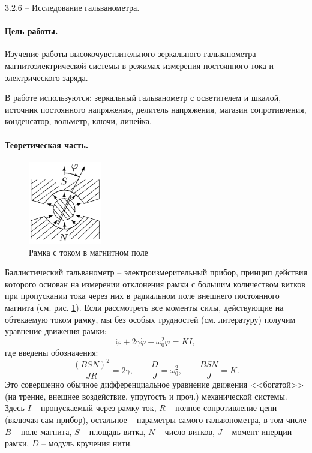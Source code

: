 \documentclass{../lab_class}
\begin{document}
{\Large 3.2.6 -- Исследование гальванометра.}

\paragraph{Цель работы.}
Изучение работы высокочувствительного зеркального гальванометра магнитоэлектрической системы в режимах измерения постоянного тока и электрического заряда.

В работе используются: зеркальный гальванометр с осветителем и шкалой, источник постоянного напряжения, делитель напряжения, магазин сопротивления, конденсатор, вольметр, ключи, линейка.

\paragraph{Теоретическая часть.}

\begin{figure}
	\centering
	\includegraphics[width=3.2cm]{galvanometer.png}
	\caption{Рамка с током в магнитном поле}
	\label{fig:galvano}
\end{figure}

Баллистический гальванометр -- электроизмерительный прибор, принцип действия которого основан на измерении отклонения рамки с большим количеством витков при пропускании тока через них в радиальном поле внешнего постоянного магнита (см. рис. \ref{fig:galvano}). Если рассмотреть все моменты силы, действующие на обтекаемую током рамку, мы без особых трудностей (см. литературу) получим уравнение движения рамки:
\begin{equation}\label{eq:galvano_movement}
	\ddot{\varphi} + 2 \gamma \dot{\varphi} + \omega_0^2 \varphi = KI,
\end{equation}
где введены обозначения:
\begin{equation*}
	\frac{(BSN)^2}{JR} = 2 \gamma, \qquad \frac{D}{J} = \omega_0^2, \qquad \frac{BSN}{J} = K.
\end{equation*}
Это совершенно обычное дифференциальное уравнение движения <<богатой>> (на трение, внешнее воздействие, упругость и проч.) механической системы. Здесь $I$ -- пропускаемый через рамку ток, $R$ -- полное сопротивление цепи (включая сам прибор), остальное -- параметры самого гальвонометра, в том числе $B$ -- поле магнита, $S$ -- площадь витка, $N$ -- число витков, $J$ -- момент инерции рамки, $D$ -- модуль кручения нити. 
\end{document}
